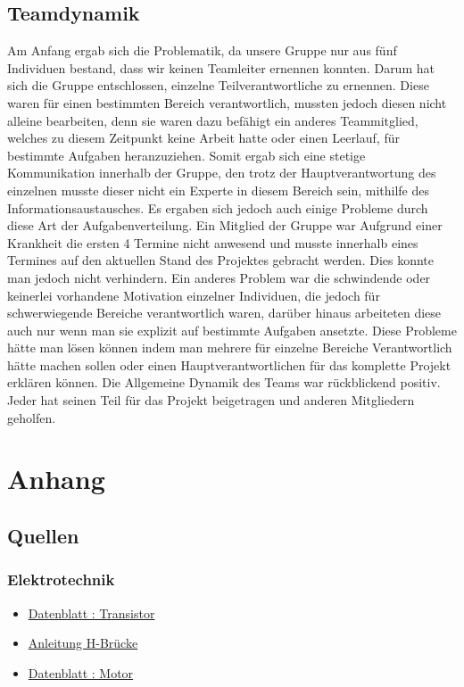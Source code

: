\documentclass[notitlepage]{report}
\begin{document}
\section{Teamdynamik}

Am Anfang ergab sich die Problematik, da unsere Gruppe nur aus f\"{u}nf Individuen bestand, dass wir keinen Teamleiter ernennen konnten. Darum hat sich die Gruppe entschlossen, einzelne Teilverantwortliche zu ernennen. Diese waren f\"{u}r einen bestimmten Bereich verantwortlich, mussten jedoch diesen nicht alleine bearbeiten, denn sie waren dazu bef\"{a}higt ein anderes Teammitglied, welches zu diesem Zeitpunkt keine Arbeit hatte oder einen Leerlauf, f\"{u}r bestimmte Aufgaben heranzuziehen.
Somit ergab sich eine stetige Kommunikation innerhalb der Gruppe, den trotz der Hauptverantwortung des einzelnen musste dieser nicht ein Experte in diesem Bereich sein, mithilfe des Informationsaustausches.
Es ergaben sich jedoch auch einige Probleme durch diese Art der Aufgabenverteilung. Ein Mitglied der Gruppe war Aufgrund einer Krankheit die ersten 4 Termine nicht anwesend und musste innerhalb eines Termines auf den aktuellen Stand des Projektes gebracht werden. Dies konnte man jedoch nicht verhindern. Ein anderes Problem war die schwindende oder keinerlei vorhandene Motivation einzelner Individuen, die jedoch f\"{u}r schwerwiegende Bereiche verantwortlich waren, dar\"{u}ber hinaus arbeiteten diese auch nur wenn man sie explizit auf bestimmte Aufgaben ansetzte. 
Diese Probleme h\"{a}tte man l\"{o}sen k\"{o}nnen indem man mehrere f\"{u}r einzelne Bereiche Verantwortlich h\"{a}tte machen sollen oder einen Hauptverantwortlichen f\"{u}r das komplette Projekt erkl\"{a}ren k\"{o}nnen.
Die Allgemeine Dynamik des Teams war r\"{u}ckblickend positiv. Jeder hat seinen Teil f\"{u}r das Projekt beigetragen und anderen Mitgliedern geholfen.


\chapter{Anhang}


\section{Quellen}

\subsection{Elektrotechnik}
\begin{itemize}

\item \href{http://cdn-reichelt.de/documents/datenblatt/A100/BC546_48-CDIL.pdf}{Datenblatt : Transistor}


\item \href{http://anleitung.joy-it.net/wp-content/uploads/2017/06/SBC-MotoDriver2-Anleitung.pdf}{Anleitung H-Br\"{u}cke}

\item \href{http://cdn-reichelt.de/documents/datenblatt/A300/COM_MOTOR_RAD_DB-DE.pdf}{Datenblatt : Motor}

\end{itemize}
\end{document}
